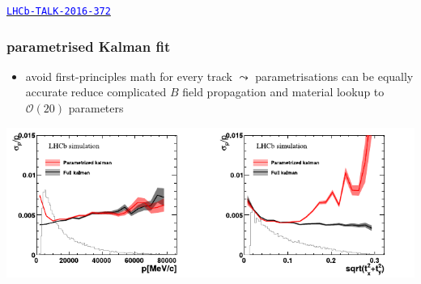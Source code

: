 \documentclass[table,xcolor=dvipsnames,professionalfonts]{beamer}
\newcommand{\myhref}[2]{\href{#1}{\footnotesize{\textcolor{blue}{\texttt{#2}}}}}
\begin{document}
\begin{frame}
\begin{columns}
\begin{column}{.5\textwidth}
    \end{column}
    \end{columns}
    \myhref{https://cds.cern.ch/record/2229971}{LHCb-TALK-2016-372}
\end{frame}

\begin{frame}[t]
  \frametitle{parametrised Kalman fit}
  \begin{itemize}
    \item avoid first-principles math for every track
      \newline $\leadsto$ parametrisations can be equally accurate
      \newline reduce complicated $B$ field propagation and material lookup to $\mathcal{O}(20)$ parameters
  \end{itemize}
  \includegraphics[width=\textwidth]{./param.pdf}
\end{frame}
\end{document}
